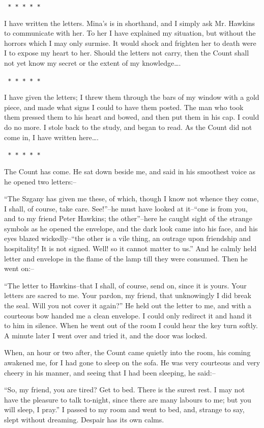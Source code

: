 \documentclass[12pt,openright]{book}
\begin{document}
\texttt{   *       *       *       *       *}

I have written the letters. Mina’s is in shorthand, and I simply ask Mr. Hawkins to communicate with her. To her I have explained my situation, but without the horrors which I may only surmise. It would shock and frighten her to death were I to expose my heart to her. Should the letters not carry, then the Count shall not yet know my secret or the extent of my knowledge….

\texttt{   *       *       *       *       *}

I have given the letters; I threw them through the bars of my window with a gold piece, and made what signs I could to have them posted. The man who took them pressed them to his heart and bowed, and then put them in his cap. I could do no more. I stole back to the study, and began to read. As the Count did not come in, I have written here….

\texttt{   *       *       *       *       *}

The Count has come. He sat down beside me, and said in his smoothest voice as he opened two letters:–

“The Szgany has given me these, of which, though I know not whence they come, I shall, of course, take care. See!”–he must have looked at it–“one is from you, and to my friend Peter Hawkins; the other”–here he caught sight of the strange symbols as he opened the envelope, and the dark look came into his face, and his eyes blazed wickedly–“the other is a vile thing, an outrage upon friendship and hospitality! It is not signed. Well! so it cannot matter to us.” And he calmly held letter and envelope in the flame of the lamp till they were consumed. Then he went on:–

“The letter to Hawkins–that I shall, of course, send on, since it is yours. Your letters are sacred to me. Your pardon, my friend, that unknowingly I did break the seal. Will you not cover it again?” He held out the letter to me, and with a courteous bow handed me a clean envelope. I could only redirect it and hand it to him in silence. When he went out of the room I could hear the key turn softly. A minute later I went over and tried it, and the door was locked.

When, an hour or two after, the Count came quietly into the room, his coming awakened me, for I had gone to sleep on the sofa. He was very courteous and very cheery in his manner, and seeing that I had been sleeping, he said:–

“So, my friend, you are tired? Get to bed. There is the surest rest. I may not have the pleasure to talk to-night, since there are many labours to me; but you will sleep, I pray.” I passed to my room and went to bed, and, strange to say, slept without dreaming. Despair has its own calms.
\end{document}
